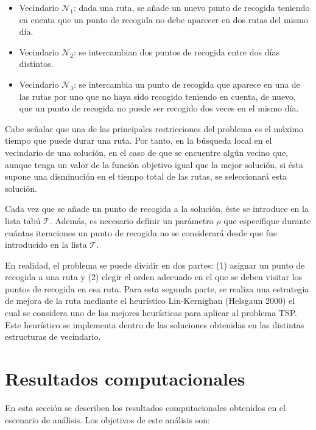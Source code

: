 \documentclass[
]{article}
\begin{document}
\begin{itemize}
\item
  Vecindario \(\mathcal{N}_1\): dada una ruta, se añade un nuevo punto
  de recogida teniendo en cuenta que un punto de recogida no debe
  aparecer en dos rutas del mismo día.
\item
  Vecindario \(\mathcal{N}_2\): se intercambian dos puntos de recogida
  entre dos días distintos.
\item
  Vecindario \(\mathcal{N}_3\): se intercambia un punto de recogida que
  aparece en una de las rutas por uno que no haya sido recogido teniendo
  en cuenta, de nuevo, que un punto de recogida no puede ser recogido
  dos veces en el mismo día.
\end{itemize}

Cabe señalar que una de las principales restricciones del problema es el
máximo tiempo que puede durar una ruta. Por tanto, en la búsqueda local
en el vecindario de una solución, en el caso de que se encuentre algún
vecino que, aunque tenga un valor de la función objetivo igual que la
mejor solución, si ésta supone una disminución en el tiempo total de las
rutas, se seleccionará esta solución.

Cada vez que se añade un punto de recogida a la solución, éste se
introduce en la lista tabú \(\mathcal{T}\). Además, es necesario definir
un parámetro \(\rho\) que especifique durante cuántas iteraciones un
punto de recogida no se considerará desde que fue introducido en la
lista \(\mathcal{T}\).

En realidad, el problema se puede dividir en dos partes: (1) asignar un
punto de recogida a una ruta y (2) elegir el orden adecuado en el que se
deben visitar los puntos de recogida en esa ruta. Para esta segunda
parte, se realiza una estrategia de mejora de la ruta mediante el
heurístico Lin-Kernighan (Helsgaun 2000) el cual se considera uno de las
mejores heurísticas para aplicar al problema TSP. Este heurístico se
implementa dentro de las soluciones obtenidas en las distintas
estructuras de vecindario.

\hypertarget{resultados-computacionales}{%
\section{Resultados computacionales}\label{resultados-computacionales}}

En esta sección se describen los resultados computacionales obtenidos en
el escenario de análisis. Los objetivos de este análisis son:
\end{document}
